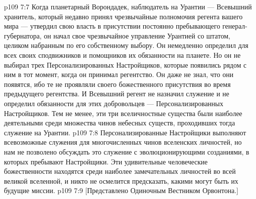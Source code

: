 \vs p109 7:7 \pc Когда планетарный Ворондадек, наблюдатель на Урантии --- Всевышний хранитель, который недавно принял чрезвычайные полномочия регента вашего мира --- утвердил свою власть в присутствии постоянно пребывающего генерал\hyp{}губернатора, он начал свое чрезвычайное управление Урантией со штатом, целиком набранным по его собственному выбору. Он немедленно определил для всех своих сподвижников и помощников их обязанности на планете. Но он не выбирал трех Персонализированных Настройщиков, которые появились рядом с ним в тот момент, когда он принимал регентство. Он даже не знал, что они появятся, ибо те не проявляли своего божественного присутствия во время предыдущего регентства. И Всевышний регент не назначил служение и не определил обязанности для этих добровольцев --- Персонализированных Настройщиков. Тем не менее, эти три вселичностные существа были наиболее деятельными среди множества чинов небесных существ, проходивших тогда служение на Урантии.
\vs p109 7:8 \pc Персонализированные Настройщики выполняют всевозможные служения для многочисленных чинов вселенских личностей, но нам не позволено обсуждать это служение с эволюционирующими созданиями, в которых пребывают Настройщики. Эти удивительные человеческие божественности находятся среди наиболее замечательных личностей во всей великой вселенной, и никто не осмелится предсказать, какими могут быть их будущие миссии.
\vsetoff
\vs p109 7:9 [Представлено Одиночным Вестником Орвонтона.]
